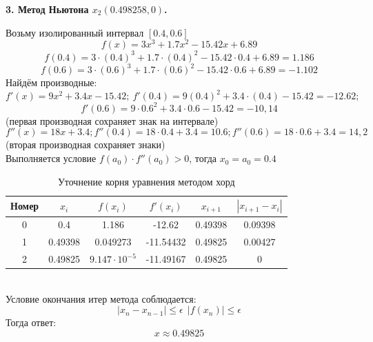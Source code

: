 \documentclass{article}
\begin{document}
\textbf{3. Метод Ньютона $x_2(0.498258, 0)$.}
\begin{center}
\end{center}
Возьму изолированный интервал $[0.4, 0.6]$
\[f(x) = 3x^3+1.7x^2-15.42x+6.89\]
\[f(0.4) = 3\cdot (0.4)^3+1.7\cdot (0.4)^2-15.42\cdot 0.4+6.89=1.186\]
\[f(0.6) = 3\cdot (0.6)^3+1.7\cdot (0.6)^2-15.42\cdot 0.6+6.89 = -1.102\]
Найдём производные:
\[f'(x) = 9x^2 +3.4x - 15.42;\ f'(0.4) = 9(0.4)^2 +3.4\cdot(0.4) - 15.42 = -12.62;\]
\[f'(0.6) = 9\cdot 0.6^2 +3.4\cdot 0.6 - 15.42 = -10,14\]
(первая производная сохраняет знак на интервале)
\[f''(x) = 18x + 3.4; f''(0.4) = 18\cdot 0.4 + 3.4 = 10.6; f''(0.6) = 18\cdot 0.6 + 3.4 = 14,2\]
(вторая производная сохраняет знаки)
\\
Выполняется условие $f(a_0)\cdot f''(a_0)>0$, тогда $x_0 = a_0 = 0.4$
\begin{table}[h]
    \centering
    \begin{tabular}{|*{6}{c|}}
        \hline
        Номер & $x_i$ & $f(x_i)$ & $f'(x_i)$& $x_{i+1}$& $|x_{i+1}-x_i|$\\
        \hline
        0& 0.4& 1.186& -12.62& 0.49398& 0.09398\\
        \hline
        1& 0.49398& 0.049273& -11.54432& 0.49825& 0.00427\\
        \hline
        2& 0.49825& $9.147\cdot 10^{-5}$& -11.49167& 0.49825& 0\\
        \hline
    \end{tabular}
    \caption{Уточнение корня уравнения методом хорд}
    \end{table}
\\
Условие окончания итер метода соблюдается: 
\[|x_n - x_{n-1}|\leq\epsilon \ \ |f(x_n)|\leq\epsilon\]
Тогда ответ:
\[x \approx 0.49825\]
\end{document}

